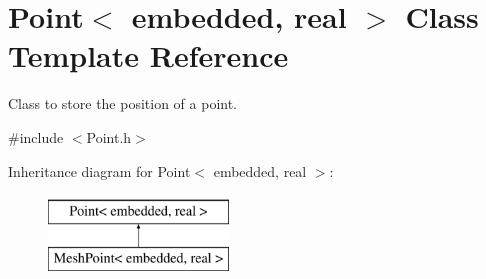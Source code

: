 \hypertarget{class_point}{\section{\-Point$<$ embedded, real $>$ \-Class \-Template \-Reference}
\label{class_point}
}


\-Class to store the position of a point.  




{\ttfamily \#include $<$\-Point.\-h$>$}

\-Inheritance diagram for \-Point$<$ embedded, real $>$\-:\begin{figure}[H]
\begin{center}
\leavevmode
\includegraphics[height=2.000000cm]{class_point}
\end{center}
\end{figure}
